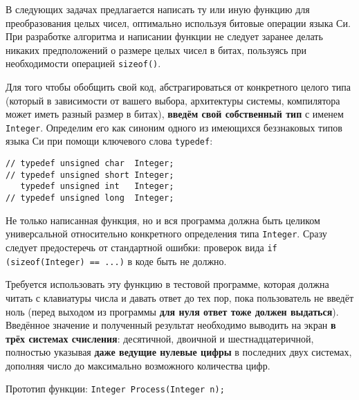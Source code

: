 
В следующих задачах предлагается написать ту или иную функцию для
преобразования целых чисел, оптимально используя битовые операции языка Си.
При разработке алгоритма и написании функции не следует заранее делать никаких
предположений о размере целых чисел в битах, пользуясь при необходимости
операцией \texttt{sizeof()}.

Для того чтобы обобщить свой код, абстрагироваться от конкретного целого типа
(который в зависимости от вашего выбора, архитектуры системы, компилятора
может иметь разный размер в битах), \textbf{введём свой собственный тип} с
именем \texttt{Integer}. Определим его как синоним одного из имеющихся
беззнаковых типов языка Си при помощи ключевого слова \texttt{typedef}:

\medskip
\begin{verbatim}
// typedef unsigned char  Integer;
// typedef unsigned short Integer;
   typedef unsigned int   Integer;
// typedef unsigned long  Integer;
\end{verbatim}
\medskip

Не только написанная функция, но и вся программа должна быть целиком
универсальной относительно конкретного определения типа \texttt{Integer}.
Сразу следует предостеречь от стандартной ошибки: проверок вида
\texttt{if (sizeof(Integer) == ...)} в коде быть не должно.

Требуется использовать эту функцию в тестовой программе, которая должна читать
с клавиатуры числа и давать ответ до тех пор, пока пользователь не введёт ноль
(перед выходом из программы \textbf{для нуля ответ тоже должен выдаться}).
Введённое значение и полученный результат необходимо выводить на экран
\textbf{в трёх системах счисления}: десятичной, двоичной и шестнадцатеричной,
полностью указывая \textbf{даже ведущие нулевые цифры} в последних двух
системах, дополняя число до максимально возможного количества цифр.

Прототип функции: \texttt{Integer Process(Integer n);}


\bigskip



